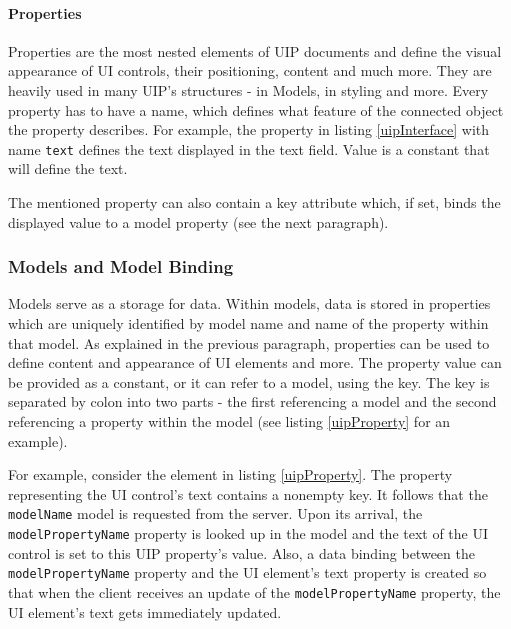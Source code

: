 \paragraph{Properties}
\label{subsec:props}
Properties are the most nested elements of UIP documents and define the visual appearance of UI controls, their positioning, content and much more. They are heavily used in many UIP's structures - in Models, in styling and more. Every property has to have a name, which defines what feature of the connected object the property describes. For example, the property in listing \ref{uipInterface} with name \texttt{text} defines the text displayed in the text field. Value is a constant that will define the text.

The mentioned property can also contain a key attribute which, if set, binds the displayed value to a model property (see the next paragraph).



\subsubsection{Models and Model Binding}
\label{subsec:models}
Models serve as a storage for data. Within models, data is stored in properties which are uniquely identified by model name and name of the property within that model. As explained in the previous paragraph, properties can be used to define content and appearance of UI elements and more. The property value can be provided as a constant, or it can refer to a model, using the key. The key is separated by colon into two parts - the first referencing a model and the second referencing a property within the model (see listing \ref{uipProperty} for an example).

For example, consider the element in listing \ref{uipProperty}. The property representing the UI control's text contains a nonempty key. It follows that the \texttt{modelName} model is requested from the server. Upon its arrival, the \texttt{modelPropertyName} property is looked up in the model and the text of the UI control is set to this UIP property's value. Also, a data binding between the \texttt{modelPropertyName} property and the UI element's text property is created so that when the client receives an update of the \texttt{modelPropertyName} property, the UI element's text gets immediately updated.

